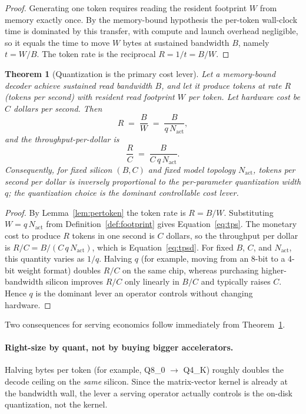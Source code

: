\documentclass[11pt]{article}
\newtheorem{theorem}{Theorem}
\begin{document}
\begin{proof}
Generating one token requires reading the resident footprint $W$ from memory exactly once. By the memory-bound hypothesis the per-token wall-clock time is dominated by this transfer, with compute and launch overhead negligible, so it equals the time to move $W$ bytes at sustained bandwidth $B$, namely $t = W/B$. The token rate is the reciprocal $R = 1/t = B/W$.
\end{proof}

\begin{theorem}[Quantization is the primary cost lever]
\label{prop:cost}
Let a memory-bound decoder achieve sustained read bandwidth $B$, and let it produce tokens at rate $R$ (tokens per second) with resident read footprint $W$ per token. Let hardware cost be $C$ dollars per second. Then
\begin{equation}
\label{eq:tps}
R \;=\; \frac{B}{W} \;=\; \frac{B}{q\,N_{\mathrm{act}}},
\end{equation}
and the throughput-per-dollar is
\begin{equation}
\label{eq:tpsd}
\frac{R}{C} \;=\; \frac{B}{C\,q\,N_{\mathrm{act}}}.
\end{equation}
Consequently, for fixed silicon $(B, C)$ and fixed model topology $N_{\mathrm{act}}$, tokens per second per dollar is inversely proportional to the per-parameter quantization width $q$; the quantization choice is the dominant controllable cost lever.
\end{theorem}

\begin{proof}
By Lemma~\ref{lem:pertoken} the token rate is $R = B/W$. Substituting $W = q\,N_{\mathrm{act}}$ from Definition~\ref{def:footprint} gives Equation~\eqref{eq:tps}. The monetary cost to produce $R$ tokens in one second is $C$ dollars, so the throughput per dollar is $R/C = B/(C\,q\,N_{\mathrm{act}})$, which is Equation~\eqref{eq:tpsd}. For fixed $B$, $C$, and $N_{\mathrm{act}}$, this quantity varies as $1/q$. Halving $q$ (for example, moving from an 8-bit to a 4-bit weight format) doubles $R/C$ on the same chip, whereas purchasing higher-bandwidth silicon improves $R/C$ only linearly in $B/C$ and typically raises $C$. Hence $q$ is the dominant lever an operator controls without changing hardware.
\end{proof}

Two consequences for serving economics follow immediately from Theorem~\ref{prop:cost}.

\paragraph{Right-size by quant, not by buying bigger accelerators.} Halving bytes per token (for example, Q8\_0 $\to$ Q4\_K) roughly doubles the decode ceiling on the \emph{same} silicon. Since the matrix-vector kernel is already at the bandwidth wall, the lever a serving operator actually controls is the on-disk quantization, not the kernel.
\end{document}

